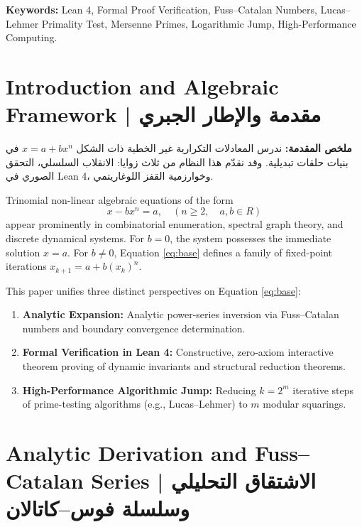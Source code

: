 \documentclass[11pt,a4paper]{article}
\theoremstyle{definition}
\begin{document}
\textbf{Keywords:} Lean 4, Formal Proof Verification, Fuss--Catalan Numbers, Lucas--Lehmer Primality Test, Mersenne Primes, Logarithmic Jump, High-Performance Computing.

\section{Introduction and Algebraic Framework | مقدمة والإطار الجبري}

\begin{Arabic}
\begin{flushright}
\textbf{ملخص المقدمة:} ندرس المعادلات التكرارية غير الخطية ذات الشكل $x=a+b x^n$ في بنيات حلقات تبديلية. وقد نقدّم هذا النظام من ثلاث زوايا: الانقلاب السلسلي، التحقق الصوري في Lean 4، وخوارزمية القفز اللوغاريتمي.
\end{flushright}
\end{Arabic}

Trinomial non-linear algebraic equations of the form
\begin{equation}\label{eq:base}
x - b x^n = a, \quad (n \ge 2, \quad a,b \in R)
\end{equation}
appear prominently in combinatorial enumeration, spectral graph theory, and discrete dynamical systems. For $b=0$, the system possesses the immediate solution $x=a$. For $b \neq 0$, Equation \eqref{eq:base} defines a family of fixed-point iterations $x_{k+1} = a + b (x_k)^n$.

This paper unifies three distinct perspectives on Equation \eqref{eq:base}:
\begin{enumerate}
    \item \textbf{Analytic Expansion:} Analytic power-series inversion via Fuss--Catalan numbers and boundary convergence determination.
    \item \textbf{Formal Verification in Lean 4:} Constructive, zero-axiom interactive theorem proving of dynamic invariants and structural reduction theorems.
    \item \textbf{High-Performance Algorithmic Jump:} Reducing $k = 2^m$ iterative steps of prime-testing algorithms (e.g., Lucas--Lehmer) to $m$ modular squarings.
\end{enumerate}

\section{Analytic Derivation and Fuss--Catalan Series | الاشتقاق التحليلي وسلسلة فوس--كاتالان}
\end{document}
